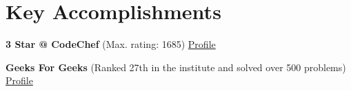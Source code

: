 \documentclass[a4paper,11pt]{article}
\begin{document}
\section{Key Accomplishments}
\textbf{3 Star @ CodeChef} (Max. rating: 1685)
\hfill{ \href{https://www.codechef.com/users/gupta_mudit}{Profile}}\


\textbf{Geeks For Geeks} (Ranked 27th in the institute and solved over 500 problems) \hfill{ \href{https://auth.geeksforgeeks.org/user/muditguptaec20/practice}{Profile}}\
\end{document}
